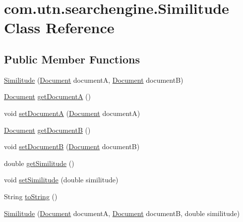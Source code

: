 \hypertarget{classcom_1_1utn_1_1searchengine_1_1_similitude}{\section{com.\-utn.\-searchengine.\-Similitude \-Class \-Reference}
\label{classcom_1_1utn_1_1searchengine_1_1_similitude}
}
\subsection*{\-Public \-Member \-Functions}
\begin{DoxyCompactItemize}
\item 
\hyperlink{classcom_1_1utn_1_1searchengine_1_1_similitude_a27b44683a397eb011e0bba61d7fc1f34}{\-Similitude} (\hyperlink{classcom_1_1utn_1_1searchengine_1_1_document}{\-Document} document\-A, \hyperlink{classcom_1_1utn_1_1searchengine_1_1_document}{\-Document} document\-B)
\item 
\hyperlink{classcom_1_1utn_1_1searchengine_1_1_document}{\-Document} \hyperlink{classcom_1_1utn_1_1searchengine_1_1_similitude_aef3d88a14327f7c50d898e2f76b2efe5}{get\-Document\-A} ()
\item 
void \hyperlink{classcom_1_1utn_1_1searchengine_1_1_similitude_a401bd9c76adff466acbe3d89300bbd70}{set\-Document\-A} (\hyperlink{classcom_1_1utn_1_1searchengine_1_1_document}{\-Document} document\-A)
\item 
\hyperlink{classcom_1_1utn_1_1searchengine_1_1_document}{\-Document} \hyperlink{classcom_1_1utn_1_1searchengine_1_1_similitude_a50f6af878b939de605090250557eeebc}{get\-Document\-B} ()
\item 
void \hyperlink{classcom_1_1utn_1_1searchengine_1_1_similitude_ab169968f568ac79ab5ce5f3ceaa1c2ac}{set\-Document\-B} (\hyperlink{classcom_1_1utn_1_1searchengine_1_1_document}{\-Document} document\-B)
\item 
double \hyperlink{classcom_1_1utn_1_1searchengine_1_1_similitude_af4c995a7282bbd1dde1c0f5e076e8c78}{get\-Similitude} ()
\item 
void \hyperlink{classcom_1_1utn_1_1searchengine_1_1_similitude_a7bd1eeccb10b7a90b72d47fb0250e5b6}{set\-Similitude} (double similitude)
\item 
\-String \hyperlink{classcom_1_1utn_1_1searchengine_1_1_similitude_af6f5090b7b8559337d21a272f0a8bfa0}{to\-String} ()
\item 
\hyperlink{classcom_1_1utn_1_1searchengine_1_1_similitude_a2fa6b7727050c3a4739dea1edecbca62}{\-Similitude} (\hyperlink{classcom_1_1utn_1_1searchengine_1_1_document}{\-Document} document\-A, \hyperlink{classcom_1_1utn_1_1searchengine_1_1_document}{\-Document} document\-B, double similitude)
\end{DoxyCompactItemize}


